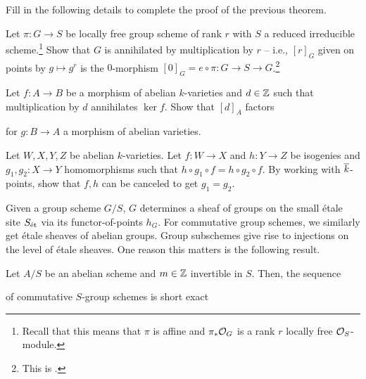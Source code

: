 \documentclass[11pt]{article}
\begin{document}
\begin{exercise}
Fill in the following details to complete the proof of the previous theorem. 
\begin{enum}{\arabic}
\item Let $\pi: G\to S$ be locally free group scheme of rank $r$ with $S$ a reduced irreducible scheme.\footnote{Recall that this means that $\pi$ is affine and $\pi_*\mathcal{O}_G$ is a rank $r$ locally free $\mathcal{O}_S$-module.} Show that $G$ is annihilated by multiplication by $r$ -- i.e., $[r]_G$ given on points by $g\mapsto g^r$ is the $0$-morphism $[0]_G=e\circ\pi: G\to S\to G$.\footnote{This is \cite[\textrm{Exercise (4.4)}]{Moonen}.}

\item Let $f: A\to B$ be a morphism of abelian $k$-varieties and $d\in\mathbb{Z}$ such that multiplication by $d$ annihilates $\ker f$. Show that $[d]_A$ factors
\begin{center}
\end{center}
for $g: B\to A$ a morphism of abelian varieties.

\item Let $W,X,Y,Z$ be abelian $k$-varieties. Let $f: W\to X$ and $h: Y\to Z$ be isogenies and $g_1,g_2: X\to Y$ homomorphisms such that $h\circ g_1\circ f=h\circ g_2\circ f$. By working with $\overline{k}$-points, show that $f,h$ can be canceled to get $g_1=g_2$.
\end{enum}
\end{exercise}

Given a group scheme $G/S$, $G$ determines a sheaf of groups on the small \'{e}tale site $S_{\operatorname{\acute{e}t}}$ via its functor-of-points $h_G$. For commutative group schemes, we similarly get \'{e}tale sheaves of abelian groups. Group subschemes give rise to injections on the level of \'{e}tale sheaves. One reason this matters is the following result.

\begin{corollary}\label{torsion_exact_sequence}
Let $A/S$ be an abelian scheme and $m\in\mathbb{Z}$ invertible in $S$. Then, the sequence
\begin{center}
\end{center}
of commutative $S$-group schemes is short exact 
\end{corollary}
\end{document}
